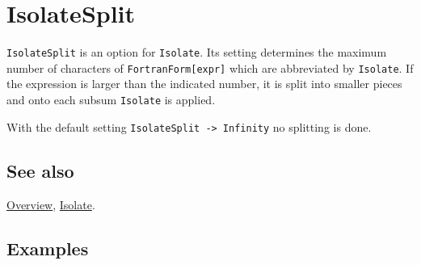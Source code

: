 \documentclass[../FeynCalcManual.tex]{subfiles}
\begin{document}
\hypertarget{isolatesplit}{%
\section{IsolateSplit}\label{isolatesplit}}

\texttt{IsolateSplit} is an option for \texttt{Isolate}. Its setting
determines the maximum number of characters of
\texttt{FortranForm[\allowbreak{}expr]} which are abbreviated by
\texttt{Isolate}. If the expression is larger than the indicated number,
it is split into smaller pieces and onto each subsum \texttt{Isolate} is
applied.

With the default setting \texttt{IsolateSplit -> Infinity} no splitting
is done.

\subsection{See also}

\hyperlink{toc}{Overview}, \hyperlink{isolate}{Isolate}.

\subsection{Examples}
\end{document}
